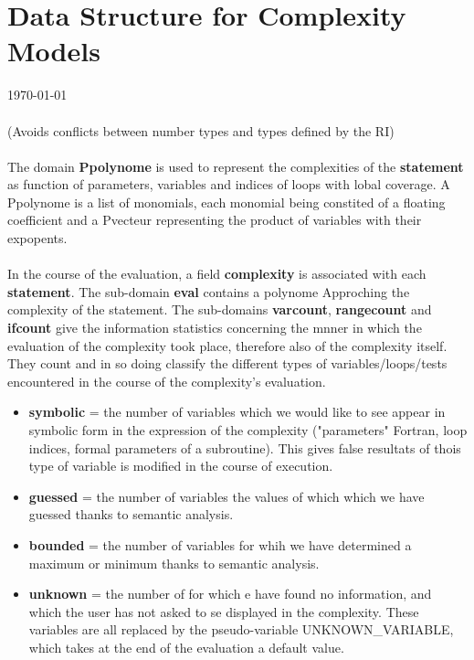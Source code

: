 \documentclass[a4]{article}
\begin{document}
\section*{Data Structure for Complexity Models }
\today
 
{
\paragraph{}
(Avoids conflicts between number types and types defined by the RI)
}
{
\paragraph{}
The domain {\bf Ppolynome} is used to represent the complexities of
the {\bf statement} as function of parameters, variables and indices
of loops with lobal coverage.  A Ppolynome is a list of monomials,
each monomial being constited of a floating coefficient and a Pvecteur
representing the product of variables with their expopents.  }
 
{
\paragraph{}
In the course of the evaluation, a field {\bf complexity} is
associated with each {\bf statement}. The sub-domain {\bf eval}
contains a polynome Approching the complexity of the statement. The
sub-domains {\bf varcount}, {\bf rangecount} and {\bf ifcount} give
the information statistics concerning the mnner in which the
evaluation of the complexity took place, therefore also of the
complexity itself. They count and in so doing classify the different
types of variables/loops/tests encountered in the course of the
complexity's evaluation.  }
 
{
\begin{itemize}

\item {\bf symbolic} = the number of variables which we would like to
  see appear in symbolic form in the expression of the complexity
  ("parameters" Fortran, loop indices, formal parameters of a
  subroutine). This gives false resultats of thois type of variable is
  modified in the course of execution.

\item {\bf guessed} = the number of variables the values of which
  which we have guessed thanks to semantic analysis.
    
\item {\bf bounded} = the number of variables for whih we have
  determined a maximum or minimum thanks to semantic analysis.
 
\item {\bf unknown} = the number of for which e have found no
  information, and which the user has not asked to se displayed in the
  complexity. These variables are all replaced by the pseudo-variable
  UNKNOWN\_VARIABLE, which takes at the end of the evaluation a
  default value.
\end{itemize}
}
 
\end{document}
